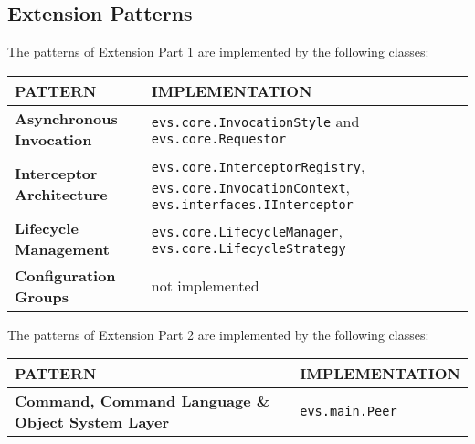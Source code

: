 \documentclass[a4paper]{article}
\begin{document}
\vspace{1cm}

\subsection*{Extension Patterns}

The patterns of Extension Part 1 are implemented by the following classes:\\

\begin{small}
\begin{tabular}{| p{4cm} | p{9cm} |}\hline
\textbf{PATTERN} & \textbf{IMPLEMENTATION}\\\hline\hline
\textbf{Asynchronous Invocation} & \texttt{evs.core.InvocationStyle} and \texttt{evs.core.Requestor}\\\hline
\textbf{Interceptor Architecture} & \texttt{evs.core.InterceptorRegistry}, \texttt{evs.core.InvocationContext}, \texttt{evs.interfaces.IInterceptor}\\\hline
\textbf{Lifecycle Management} & \texttt{evs.core.LifecycleManager}, \texttt{evs.core.LifecycleStrategy}\\\hline
\textbf{Configuration Groups} & not implemented \\\hline
\end{tabular}
\end{small}

\vspace{0.5cm}
The patterns of Extension Part 2 are implemented by the following classes:\\

\begin{small}
\begin{tabular}{| p{4cm} | p{9cm} |}\hline
\textbf{PATTERN} & \textbf{IMPLEMENTATION}\\\hline\hline
\textbf{Command, Command Language \& Object System Layer} & \texttt{evs.main.Peer}\\\hline
\end{tabular}
\end{small}
\end{document}
